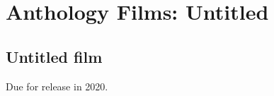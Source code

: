 \chapter{Anthology Films: Untitled}
		\label{appendixB}


\section{Untitled film}

Due for release in 2020.


